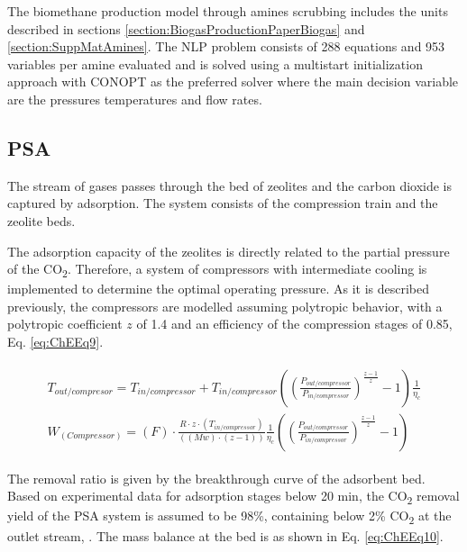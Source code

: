 \begin{refsection}[referencesCh7]
The biomethane production model through amines scrubbing includes the units described in sections \ref{section:BiogasProductionPaperBiogas} and \ref{section:SuppMatAmines}. The NLP problem consists of 288 equations and 953 variables per amine evaluated and is solved using a multistart initialization approach with CONOPT as the preferred solver where the main decision variable are the pressures temperatures and flow rates.

\subsection{PSA} \label{section:SuppMatPSA}
The stream of gases passes through the bed of zeolites and the carbon dioxide is captured by adsorption. The system consists of the compression train and the zeolite beds. 

The adsorption capacity of the zeolites is directly related to the partial pressure of the CO\textsubscript{2}. Therefore, a system of compressors with intermediate cooling is implemented to determine the optimal operating pressure. As it is described previously, the compressors are modelled assuming polytropic behavior, with a polytropic coefficient $z$ of 1.4 and an efficiency of the compression stages of 0.85, Eq. \ref{eq:ChEEq9}. 

\begin{align}
\begin{array}{l}{T_{out/compresor}} = {T_{in/compressor}} + {T_{in/compressor}}\left( {{{\left( {\frac{{{P_{out/compressor}}}}{{{P_{in/compressor}}}}} \right)}^{\frac{{z - 1}}{z}}} - 1} \right)\frac{1}{{{\eta _c}}}\\{{{W}}_{\left( {Compressor} \right)}} = \left( F \right)\cdot\frac{{R\cdot z\cdot\left( {{{{T}}_{in/compressor}}} \right)}}{{\left( {\left( {{{M}}w} \right)\cdot\left( {z - {{1}}} \right)} \right)}}\frac{1}{{{\eta _c}}}\left( {{{\left( {\frac{{{P_{out/compressor}}}}{{{P_{in/compressor}}}}} \right)}^{\frac{{z - 1}}{z}}} - {{1}}} \right)\end{array} \label{eq:ChEEq9}
\end{align}

The removal ratio is given by the breakthrough curve of the adsorbent bed. Based on experimental data \citep{hauchhum2014carbon} for adsorption stages below 20 min, the CO\textsubscript{2} removal yield of the PSA system is assumed to be 98\%, containing below 2\% CO\textsubscript{2} at the outlet stream, \citep{ferella2017separation}. The mass balance at the bed is as shown in Eq. \ref{eq:ChEEq10}.


\end{refsection}
